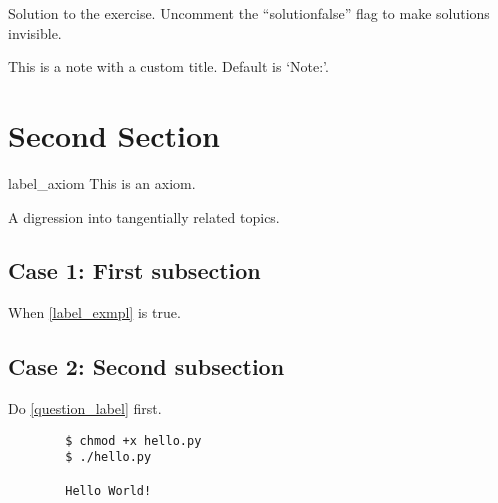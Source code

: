 \begin{solution}
	Solution to the exercise. Uncomment the ``solutionfalse'' flag to make solutions invisible.
\end{solution}


\begin{note}
	This is a note with a custom title. Default is `Note:'.
\end{note}



\section{Second Section}

\begin{axiom}{label_axiom}
	This is an axiom.
\end{axiom}



\begin{digression}
	A digression into tangentially related topics.
\end{digression}



\subsection{Case 1: First subsection}
When  \cref{label_exmpl} is true.
\begin{warning}[A Warning:] %
	\lipsum[1][1-2]
\end{warning}

\subsection{Case 2: Second subsection}
Do \cref{question_label} first.



\begin{code}[Code:]
	\begin{verbatim}
		$ chmod +x hello.py
		$ ./hello.py
		
		Hello World!
	\end{verbatim}
\end{code}
